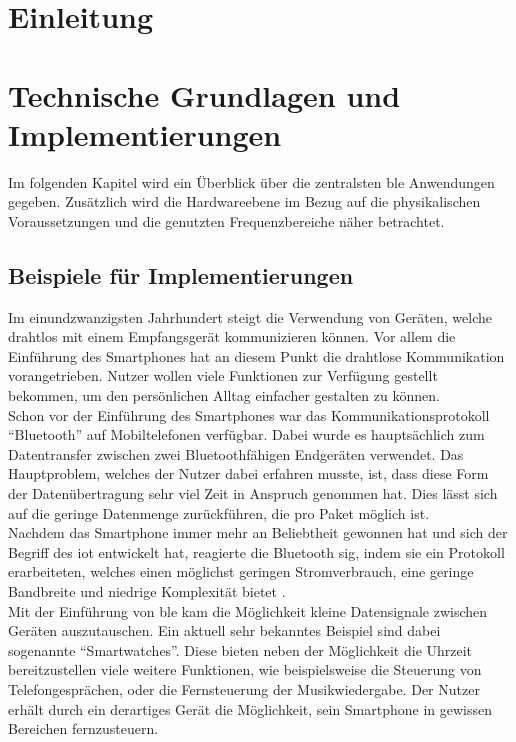 \section{Einleitung}
\label{s:intro}



\section{Technische Grundlagen und Implementierungen}
\label{s:grundlagen}

Im folgenden Kapitel wird ein Überblick über die zentralsten \ac{ble} Anwendungen gegeben. Zusätzlich wird die Hardwareebene im Bezug auf die physikalischen Voraussetzungen und die genutzten Frequenzbereiche näher betrachtet. 

\subsection{Beispiele für Implementierungen}
\label{ss:grundlagen:beispiele}

Im einundzwanzigsten Jahrhundert steigt die Verwendung von Geräten, welche drahtlos mit einem Empfangsgerät kommunizieren können. Vor allem die Einführung des Smartphones hat an diesem Punkt die drahtlose Kommunikation vorangetrieben. Nutzer wollen viele Funktionen zur Verfügung gestellt bekommen, um den persönlichen Alltag einfacher gestalten zu können.\\

\noindent Schon vor der Einführung des Smartphones war das Kommunikationsprotokoll "`Bluetooth"' auf Mobiltelefonen verfügbar. Dabei wurde es hauptsächlich zum Datentransfer zwischen zwei Bluetoothfähigen Endgeräten verwendet. Das Hauptproblem, welches der Nutzer dabei erfahren musste, ist, dass diese Form der Datenübertragung sehr viel Zeit in Anspruch genommen hat. Dies lässt sich auf die geringe Datenmenge zurückführen, die pro Paket möglich ist.\\

\noindent Nachdem das Smartphone immer mehr an Beliebtheit gewonnen hat und sich der Begriff des \ac{iot} entwickelt hat, reagierte die Bluetooth \ac{sig}, indem sie ein Protokoll erarbeiteten, welches einen möglichst geringen Stromverbrauch, eine geringe Bandbreite und niedrige Komplexität bietet \cite[Seite 1]{Townsend14:GSB}.\\

\noindent Mit der Einführung von \ac{ble} kam die Möglichkeit kleine Datensignale zwischen Geräten auszutauschen. Ein aktuell sehr bekanntes Beispiel sind dabei sogenannte "`Smartwatches"'. Diese bieten neben der Möglichkeit die Uhrzeit bereitzustellen viele weitere Funktionen, wie beispielsweise die Steuerung von Telefongesprächen, oder die Fernsteuerung der Musikwiedergabe. Der Nutzer erhält durch ein derartiges Gerät die Möglichkeit, sein Smartphone in gewissen Bereichen fernzusteuern.\\

